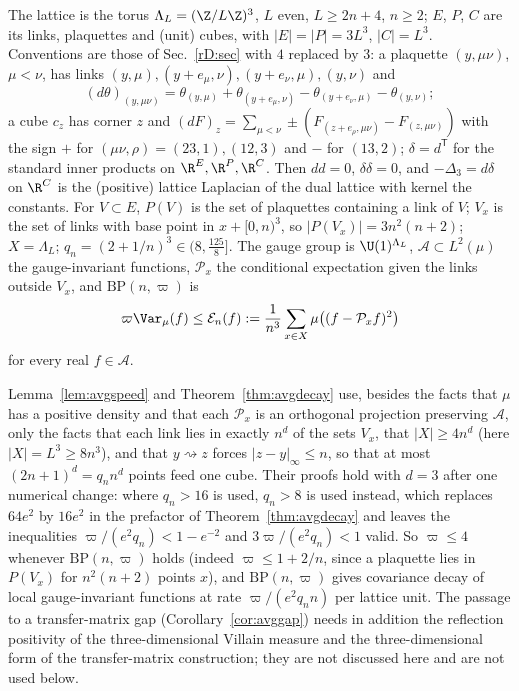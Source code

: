 The lattice is the torus $\Lambda_L=(\Z/L\Z)^3$, $L$ even, $L\ge2n+4$,
$n\ge2$; $E$, $P$, $C$ are its links, plaquettes and (unit) cubes, with
$\lvert E\rvert=\lvert P\rvert=3L^3$, $\lvert C\rvert=L^3$. Conventions
are those of Sec.~\ref{rD:sec} with $4$ replaced by $3$: a plaquette
$(y,\mu\nu)$, $\mu<\nu$, has links $(y,\mu),(y+e_\mu,\nu),(y+e_\nu,\mu),
(y,\nu)$ and
\[
(d\theta)_{(y,\mu\nu)}=\theta_{(y,\mu)}+\theta_{(y+e_\mu,\nu)}
-\theta_{(y+e_\nu,\mu)}-\theta_{(y,\nu)};
\]
a cube $c_z$ has corner $z$ and $(dF)_z=\sum_{\mu<\nu}\pm(F_{(z+e_\rho,
\mu\nu)}-F_{(z,\mu\nu)})$ with the sign $+$ for $(\mu\nu,\rho)=(23,1),
(12,3)$ and $-$ for $(13,2)$; $\delta=d^{\mathsf T}$ for the standard inner
products on $\R^E,\R^P,\R^C$. Then $dd=0$, $\delta\delta=0$, and
$-\Delta_3=d\delta$ on $\R^C$ is the (positive) lattice Laplacian of the
dual lattice with kernel the constants. For $V\subset E$, $P(V)$ is the set
of plaquettes containing a link of $V$; $V_x$ is the set of links with
base point in $x+[0,n)^3$, so $\lvert P(V_x)\rvert=3n^2(n+2)$; $X=
\Lambda_L$; $q_n=(2+1/n)^3\in(8,\frac{125}8]$. The gauge group is
$\U(1)^{\Lambda_L}$, $\mathcal A\subset L^2(\mu)$ the gauge-invariant
functions, $\mathcal P_x$ the conditional expectation given the links
outside $V_x$, and $\mathrm{BP}(n,\varpi)$ is
\[
\varpi\Var_\mu(f)\le\mathcal E_n(f):=\frac1{n^3}\sum_{x\in X}
\mu\bigl((f-\mathcal P_xf)^2\bigr)
\]
for every real $f\in\mathcal A$.

\begin{remark}[dimension]\label{rM3:dim}
Lemma~\ref{lem:avgspeed} and Theorem~\ref{thm:avgdecay} use, besides
the facts that $\mu$ has a positive density and that each $\mathcal P_x$
is an orthogonal projection preserving $\mathcal A$, only the facts that
each link lies in exactly $n^d$ of the sets $V_x$, that
$\lvert X\rvert\ge4n^d$ (here $\lvert X\rvert=L^3\ge8n^3$), and that
$y\rightsquigarrow z$ forces $\lvert z-y\rvert_\infty\le n$, so that at
most $(2n+1)^d=q_nn^d$ points feed one cube. Their proofs hold with
$d=3$ after one numerical change: where $q_n>16$ is used, $q_n>8$ is
used instead, which replaces $64e^2$ by $16e^2$ in the prefactor of
Theorem~\ref{thm:avgdecay} and leaves the inequalities
$\varpi/(e^2q_n)<1-e^{-2}$ and $3\varpi/(e^2q_n)<1$ valid. So
$\varpi\le4$ whenever $\mathrm{BP}(n,\varpi)$ holds (indeed $\varpi\le
1+2/n$, since a plaquette lies in $P(V_x)$ for $n^2(n+2)$ points $x$), and
$\mathrm{BP}(n,\varpi)$ gives covariance decay of local gauge-invariant
functions at rate $\varpi/(e^2q_nn)$ per lattice unit. The passage to a
transfer-matrix gap (Corollary~\ref{cor:avggap}) needs in addition the
reflection positivity of the three-dimensional Villain measure and the
three-dimensional form of the transfer-matrix construction; they are not
discussed here and are not used below.
\end{remark}

